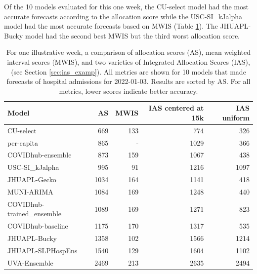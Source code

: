 \documentclass{article}\usepackage[]{graphicx}\usepackage[]{xcolor}
\begin{document}
Of the 10 models evaluated for this one week, the CU-select model had the most accurate forecasts according to the
allocation score while the USC-SI\_kJalpha model had the most accurate forecasts based on MWIS (Table
\ref{tab:multi-k-scores}). The JHUAPL-Bucky model had the second best MWIS but the third worst allocation score.



\begin{table}[ht]
\centering
\begin{tabular}{lrrrr}
  \hline
Model & AS & MWIS & IAS centered at 15k & IAS uniform \\ 
  \hline
CU-select & 669 & 133 & 774 & 326 \\ 
  per-capita & 865 & - & 1029 & 366 \\ 
  COVIDhub-ensemble & 873 & 159 & 1067 & 438 \\ 
  USC-SI\_kJalpha & 995 & 91 & 1216 & 1097 \\ 
  JHUAPL-Gecko & 1034 & 164 & 1141 & 418 \\ 
  MUNI-ARIMA & 1084 & 169 & 1248 & 440 \\ 
  COVIDhub-trained\_ensemble & 1089 & 169 & 1271 & 823 \\ 
  COVIDhub-baseline & 1175 & 170 & 1317 & 535 \\ 
  JHUAPL-Bucky & 1358 & 102 & 1566 & 1214 \\ 
  JHUAPL-SLPHospEns & 1540 & 129 & 1604 & 1102 \\ 
  UVA-Ensemble & 2469 & 213 & 2635 & 2494 \\ 
   \hline
\end{tabular}
\caption{For one illustrative week, a comparison of allocation scores (AS), mean weighted interval scores (MWIS), and two varieties of Integrated Allocation Scores (IAS), (see Section \ref{sec:ias_examp}). All metrics are shown for 10 models that made forecasts of hospital admissions for 2022-01-03. Results are sorted by AS. For all metrics, lower scores indicate better accuracy.} 
\label{tab:multi-k-scores}
\end{table}
\end{document}
